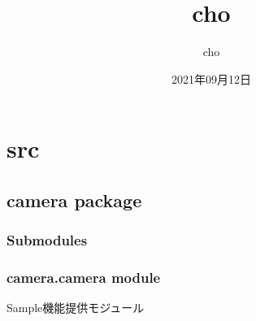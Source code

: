 \documentclass[a4paper,10pt,dvipdfmx]{sphinxmanual}
\title{cho}
\date{2021年09月12日}
\author{cho}
\begin{document}
\pagestyle{empty}
\sphinxmaketitle
\pagestyle{plain}
\sphinxtableofcontents
\pagestyle{normal}
\label{\detokenize{index::doc}}



\chapter{src}
\label{\detokenize{modules:src}}\label{\detokenize{modules::doc}}

\section{camera package}
\label{\detokenize{camera:camera-package}}\label{\detokenize{camera::doc}}

\subsection{Submodules}
\label{\detokenize{camera:submodules}}

\subsection{camera.camera module}
\label{\detokenize{camera:module-camera.camera}}\label{\detokenize{camera:camera-camera-module}}
\sphinxAtStartPar
Sample機能提供モジュール
\end{document}
